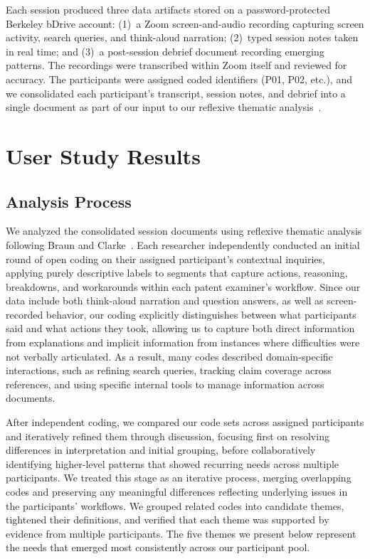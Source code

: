\documentclass[sigconf]{acmart}
\begin{document}
Each session produced three data artifacts stored on a password-protected Berkeley bDrive account: (1)~a Zoom screen-and-audio recording capturing screen activity, search queries, and think-aloud narration; (2)~typed session notes taken in real time; and (3)~a post-session debrief document recording emerging patterns. The recordings were transcribed within Zoom itself and reviewed for accuracy. The participants were assigned coded identifiers (P01, P02, etc.), and we consolidated each participant's transcript, session notes, and debrief into a single document as part of our input to our reflexive thematic analysis~\cite{Braun2006}.


\section{User Study Results}

\subsection{Analysis Process}

We analyzed the consolidated session documents using reflexive thematic analysis following Braun and Clarke~\cite{Braun2006}. Each researcher independently conducted an initial round of open coding on their assigned participant's contextual inquiries, applying purely descriptive labels to segments that capture actions, reasoning, breakdowns, and workarounds within each patent examiner's workflow. Since our data include both think-aloud narration and question answers, as well as screen-recorded behavior, our coding explicitly distinguishes between what participants said and what actions they took, allowing us to capture both direct information from explanations and implicit information from instances where difficulties were not verbally articulated. As a result, many codes described domain-specific interactions, such as refining search queries, tracking claim coverage across references, and using specific internal tools to manage information across documents.

After independent coding, we compared our code sets across assigned participants and iteratively refined them through discussion, focusing first on resolving differences in interpretation and initial grouping, before collaboratively identifying higher-level patterns that showed recurring needs across multiple participants. We treated this stage as an iterative process, merging overlapping codes and preserving any meaningful differences reflecting underlying issues in the participants' workflows. We grouped related codes into candidate themes, tightened their definitions, and verified that each theme was supported by evidence from multiple participants. The five themes we present below represent the needs that emerged most consistently across our participant pool.
\end{document}
